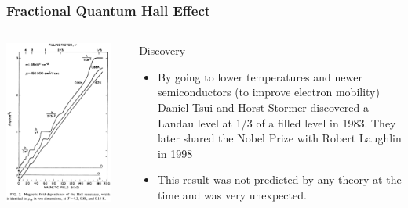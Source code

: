 \documentclass{beamer}
\begin{document}
\begin{frame}
\frametitle{Fractional Quantum Hall Effect}
\begin{columns}[T]
\begin{column}{0.5\textwidth}
\begin{center}
\includegraphics[width=0.9\textwidth]{Tsui1.eps}
\end{center}
\end{column}
\begin{column}{0.5\textwidth}
\begin{block}
{Discovery}
\begin{itemize}
\item By going to lower temperatures and newer semiconductors (to improve electron mobility) Daniel Tsui and Horst Stormer discovered a Landau level at 1/3 of a filled level in 1983. They later shared the Nobel Prize with Robert Laughlin in 1998
\item This result was not predicted by any theory at the time and was very unexpected.
\end{itemize}
\end{block}
\end{column}
\end{columns}
\end{frame}
\end{document}
